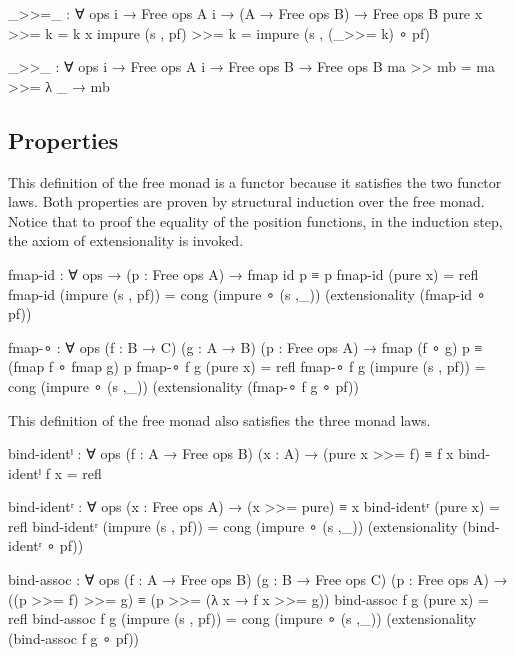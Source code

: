 \begin{code}
_>>=_ : ∀ {ops i} → Free ops A {i} → (A → Free ops B) → Free ops B
pure x           >>= k = k x
impure (s , pf)  >>= k = impure (s , (_>>= k) ∘ pf)

_>>_ : ∀ {ops i} → Free ops A {i} → Free ops B → Free ops B
ma >> mb = ma >>= λ _ → mb
\end{code}

\subsection{Properties}

This definition of the free monad is a functor because it satisfies the two
functor laws.
Both properties are proven by structural induction over the free monad.
Notice that to proof the equality of the position functions, in the induction
step, the axiom of extensionality is invoked.

\begin{code}[number=fmap-id]
fmap-id : ∀ {ops} → (p : Free ops A) → fmap id p ≡ p
fmap-id (pure x)           = refl
fmap-id (impure (s , pf))  = cong (impure ∘ (s ,_)) (extensionality (fmap-id ∘ pf))
\end{code}
\begin{code}[number=fmap-comp]
fmap-∘ : ∀ {ops} (f : B → C) (g : A → B) (p : Free ops A) →
         fmap (f ∘ g) p ≡ (fmap f ∘ fmap g) p
fmap-∘ f g (pure x)           = refl
fmap-∘ f g (impure (s , pf))  = cong (impure ∘ (s ,_)) (extensionality (fmap-∘ f g ∘ pf))
\end{code}
This definition of the free monad also satisfies the three monad laws.

\begin{code}[number=bind-ident-left]
bind-identˡ : ∀ {ops} (f : A → Free ops B) (x : A) → (pure x >>= f) ≡ f x
bind-identˡ f x = refl
\end{code}
\begin{code}[number=bind-ident-right]
bind-identʳ : ∀ {ops} (x : Free ops A) → (x >>= pure) ≡ x
bind-identʳ (pure x)           = refl
bind-identʳ (impure (s , pf))  = cong (impure ∘ (s ,_)) (extensionality (bind-identʳ ∘ pf))
\end{code}
\begin{code}[number=bind-assoc]
bind-assoc : ∀ {ops} (f : A → Free ops B) (g : B → Free ops C) (p : Free ops A) →
             ((p >>= f) >>= g) ≡ (p >>= (λ x → f x >>= g))
bind-assoc f g (pure x)           = refl
bind-assoc f g (impure (s , pf))  = cong (impure ∘ (s ,_)) (extensionality (bind-assoc f g ∘ pf))
\end{code}

